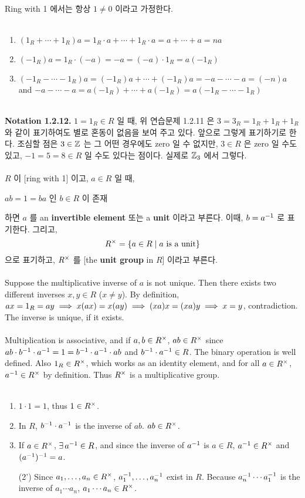 \\
Ring with 1 에서는 항상 $1\neq 0$ 이라고 가정한다.\\
\\
\begin{enumerate}
	\item $(1_R + \cdots + 1_R)a = 1_R\cdot a + \cdots + 1_R\cdot a = a + \cdots +a = na$
	\item $(-1_R)a = 1_R\cdot(-a) = -a = (-a)\cdot 1_R = a(-1_R)$
	\item $(-1_R-\cdots-1_R)a = (-1_R)a + \cdots + (-1_R)a = -a -\cdots -a = (-n)a$ and $-a -\cdots -a =a(-1_R) +\cdots + a(-1_R) = a(-1_R-\cdots-1_R)$
\end{enumerate}~
\\
\textbf{\sffamily Notation 1.2.12.} $1 = 1_R\in R$ 일 때, 위 연습문제 1.2.11 은 $3 = 3_R = 1_R + 1_R+1_R$ 와 같이 표기하여도 별로 혼동이 없음을 보여 주고 있다. 앞으로 그렇게 표기하기로 한다. 조심할 점은 $3\in \mathbb{Z}$ 는 그 어떤 경우에도 zero 일 수 없지만, $3\in R$ 은 zero 일 수도 있고, $-1=5=8\in R$ 일 수도 있다는 점이다. 실제로 $\mathbb{Z}_3$ 에서 그렇다.\\
\\
 $R$ 이 [ring with 1] 이고, $a\in R$ 일 때,
\begin{center}
	$ab=1=ba$ 인 $b\in R$ 이 존재
\end{center}
하면 $a$ 를 an \textbf{invertible element} 또는 a \textbf{unit} 이라고 부른다. 이때, $b=a^{-1}$ 로 표기한다. 그리고,
$$R^\times = \{a\in R \mid a \text{ is a unit}\}$$
으로 표기하고, $R^\times$ 를 [the \textbf{unit group} in $R$] 이라고 부른다.\\
\\
 Suppose the multiplicative inverse of $a$ is not unique. Then there exists two different inverses $x, y\in R$ ($x\neq y$). By definition, $ax = 1_R = ay \implies x(ax) = x(ay) \implies (xa)x = (xa)y \implies x = y$, contradiction. The inverse is unique, if it exists.\\
\\
 Multiplication is associative, and if $a, b\in R^\times$, $ab\in R^\times$ since $ab\cdot b^{-1}\cdot a^{-1} = 1 = b^{-1}\cdot a^{-1}\cdot ab$ and $b^{-1}\cdot a^{-1} \in R$. The binary operation is well defined. Also $1_R \in R^\times$, which works as an identity element, and for all $a\in R^\times$, $a^{-1} \in R^\times$ by definition. Thus $R^\times$ is a multiplicative group.\\
\\
\begin{enumerate}
	\item $1\cdot 1 = 1$, thus $1\in R^\times$.
	\item In $R$, $b^{-1} \cdot a^{-1}$ is the inverse of $ab$. $ab\in R^\times$.
	\item If $a\in R^\times$, $\exists\,a^{-1}\in R$, and since the inverse of $a^{-1}$ is $a\in R$, $a^{-1} \in R^\times$ and $(a^{-1})^{-1} = a$.
	\item[(2')] Since $a_1, \dots, a_n\in R^\times$, $a_1^{-1}, \dots, a_n^{-1}$ exist in $R$. Because $a_n^{-1}\cdots a_1^{-1}$ is the inverse of $a_1\cdots a_n$, $a_1\cdots a_n\in R^\times$. 
\end{enumerate}~

